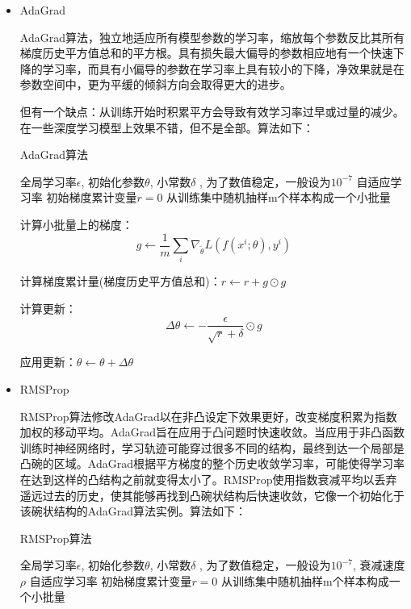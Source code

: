 \begin{itemize}
\item AdaGrad

AdaGrad算法，独立地适应所有模型参数的学习率，缩放每个参数反比其所有梯度历史平方值总和的平方根。具有损失最大偏导的参数相应地有一个快速下降的学习率，而具有小偏导的参数在学习率上具有较小的下降，净效果就是在参数空间中，更为平缓的倾斜方向会取得更大的进步。

但有一个缺点：从训练开始时积累平方会导致有效学习率过早或过量的减少。在一些深度学习模型上效果不错，但不是全部。算法如下：
\begin{algorithm}
\caption{AdaGrad算法}
\begin{algorithmic}
\Require 全局学习率$\epsilon$, 初始化参数$\theta$, 小常数$\delta$ , 为了数值稳定，一般设为$10^{-7}$
\Ensure 自适应学习率
\State 初始梯度累计变量$r=0$
\Repeat
	从训练集中随机抽样m个样本构成一个小批量
	
	计算小批量上的梯度：
	\begin{displaymath}
		g \leftarrow \frac{1}{m} \sum_{i}\nabla_{\tilde{\theta}}L(f(x^{i}; \theta), y^{i})
	\end{displaymath}
	
	计算梯度累计量(梯度历史平方值总和)：$r \leftarrow r + g \odot g$
	
	计算更新：
	\begin{displaymath}
	\Delta \theta \leftarrow - \frac{\epsilon}{\sqrt{r}+\delta} \odot g
	\end{displaymath}
	
	应用更新：$\theta \leftarrow \theta + \Delta \theta $
\end{algorithmic}
\end{algorithm}

\item RMSProp

RMSProp算法修改AdaGrad以在非凸设定下效果更好，改变梯度积累为指数加权的移动平均。AdaGrad旨在应用于凸问题时快速收敛。当应用于非凸函数训练时神经网络时，学习轨迹可能穿过很多不同的结构，最终到达一个局部是凸碗的区域。AdaGrad根据平方梯度的整个历史收敛学习率，可能使得学习率在达到这样的凸结构之前就变得太小了。RMSProp使用指数衰减平均以丢弃遥远过去的历史，使其能够再找到凸碗状结构后快速收敛，它像一个初始化于该碗状结构的AdaGrad算法实例。算法如下：
\begin{algorithm}
\caption{RMSProp算法}
\begin{algorithmic}
\Require 全局学习率$\epsilon$, 初始化参数$\theta$, 小常数$\delta$ , 为了数值稳定，一般设为$10^{-7}$, 衰减速度$\rho$
\Ensure 自适应学习率
\State 初始梯度累计变量$r=0$
\Repeat
	从训练集中随机抽样m个样本构成一个小批量
	

\end{algorithmic}
\end{algorithm}
\end{itemize}
